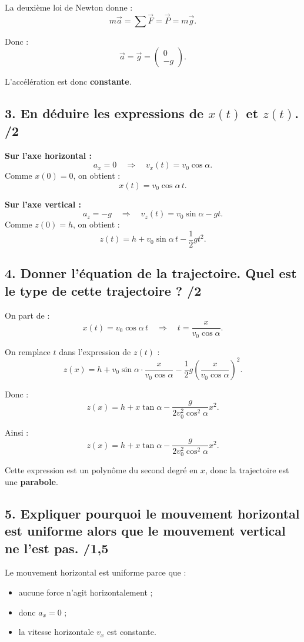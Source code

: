 \documentclass[11pt,a4paper]{article}
\begin{document}
La deuxième loi de Newton donne :
\[
m\vec a = \sum \vec F = \vec P = m\vec g.
\]

Donc :
\[
\vec a = \vec g =
\begin{pmatrix}
0\\
-g
\end{pmatrix}.
\]

L'accélération est donc \textbf{constante}.

\subsection*{3. En déduire les expressions de \(x(t)\) et \(z(t)\). \hfill /2}

\textbf{Sur l'axe horizontal :}
\[
a_x=0 \quad \Rightarrow \quad v_x(t)=v_0\cos\alpha.
\]
Comme \(x(0)=0\), on obtient :
\[
\boxed{x(t)=v_0\cos\alpha \, t.}
\]

\textbf{Sur l'axe vertical :}
\[
a_z=-g \quad \Rightarrow \quad v_z(t)=v_0\sin\alpha - gt.
\]
Comme \(z(0)=h\), on obtient :
\[
\boxed{z(t)=h+v_0\sin\alpha \, t - \frac12 gt^2.}
\]

\subsection*{4. Donner l'équation de la trajectoire. Quel est le type de cette trajectoire ? \hfill /2}

On part de :
\[
x(t)=v_0\cos\alpha \, t
\quad \Rightarrow \quad
t=\frac{x}{v_0\cos\alpha}.
\]

On remplace \(t\) dans l'expression de \(z(t)\) :
\[
z(x)=h+v_0\sin\alpha \cdot \frac{x}{v_0\cos\alpha}
-\frac12 g\left(\frac{x}{v_0\cos\alpha}\right)^2.
\]

Donc :
\[
z(x)=h+x\tan\alpha-\frac{g}{2v_0^2\cos^2\alpha}x^2.
\]

Ainsi :
\[
\boxed{z(x)=h+x\tan\alpha-\frac{g}{2v_0^2\cos^2\alpha}x^2.}
\]

Cette expression est un polynôme du second degré en \(x\), donc la trajectoire est une \textbf{parabole}.

\subsection*{5. Expliquer pourquoi le mouvement horizontal est uniforme alors que le mouvement vertical ne l'est pas. \hfill /1{,}5}

Le mouvement horizontal est uniforme parce que :
\begin{itemize}
    \item aucune force n'agit horizontalement ;
    \item donc \(a_x=0\) ;
    \item la vitesse horizontale \(v_x\) est constante.
\end{itemize}
\end{document}
